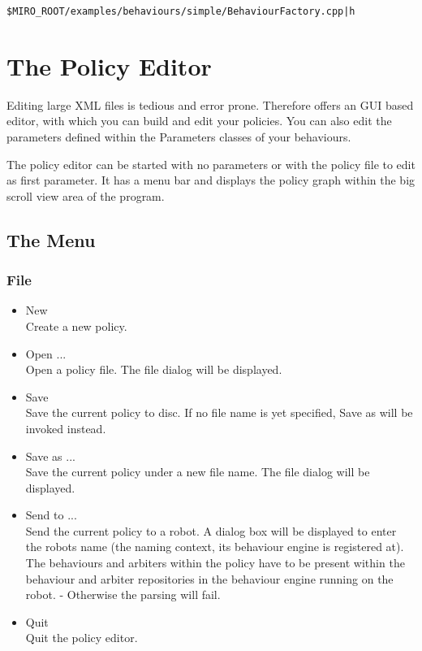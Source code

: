 {\tt \$MIRO\_ROOT/examples/behaviours/simple/BehaviourFactory.cpp|h}

\section{The Policy Editor}
\label{SEC:POLICY_EDITOR}

Editing large XML files is tedious and error prone. Therefore \miro
offers an GUI based editor, with which you can build and edit your
policies. You can also edit the parameters defined within the
Parameters classes of your behaviours.

The policy editor can be started with no parameters or with the policy
file to edit as first parameter. It has a menu bar and displays the
policy graph within the big scroll view area of the program.

\subsection{The Menu}

\subsubsection{File}
\begin{itemize}
\item New \\
  Create a new policy.
\item Open ... \\
  Open a policy file. The file dialog will be displayed.
\item Save \\
  Save the current policy to disc. If no file name is yet specified,
  Save as will be invoked instead.
\item Save as ... \\
  Save the current policy under a new file name. The file dialog will be
  displayed.
\item Send to ... \\
  Send the current policy to a robot. A dialog box will be displayed to
  enter the robots name (the naming context, its behaviour engine is
  registered at). The behaviours and arbiters within the policy have to
  be present within the behaviour and arbiter repositories in the
  behaviour engine running on the robot. - Otherwise the parsing will
  fail.
\item Quit \\
  Quit the policy editor.
\end{itemize}
